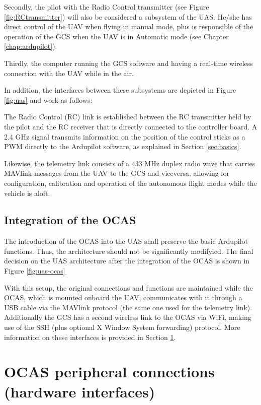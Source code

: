Secondly, the pilot with the Radio Control transmitter (see Figure \ref{fig:RCtransmitter}) will also be considered a subsystem of the UAS.
He/she has direct control of the UAV when flying in manual mode, plus is responsible of the operation of the GCS when the UAV is in Automatic mode (see Chapter \ref{chap:ardupilot}).

Thirdly, the computer running the GCS software and having a real-time wireless connection with the UAV while in the air.



In addition, the interfaces between these subsystems are depicted in Figure \ref{fig:uas} and work as follows:

The Radio Control (RC) link is established between the RC transmitter held by the pilot and the RC receiver that is directly connected to the controller board.
A 2.4 GHz signal transmits information on the position of the control sticks as a PWM directly to the Ardupilot software, as explained in Section \ref{sec:basics}.

Likewise, the telemetry link consists of a 433 MHz duplex radio wave that carries MAVlink messages from the UAV to the GCS and viceversa, allowing for configuration, calibration and operation of the autonomous flight modes while the vehicle is aloft.

\subsection{Integration of the OCAS} \label{sec:ocasintegration}

The introduction of the OCAS into the UAS shall preserve the basic Ardupilot functions.
Thus, the architecture should not be significantly modifyied.
The final decision on the UAS architecture after the integration of the OCAS is shown in Figure \ref{fig:uas-ocas}



With this setup, the original connections and functions are maintained while the OCAS, which is mounted onboard the UAV, communicates with it through a USB cable via the MAVlink protocol (the same one used for the telemetry link).
Additionally the GCS has a second wireless link to the OCAS via WiFi, making use of the SSH (plus optional X Window System forwarding) protocol.
More information on these interfaces is provided in Section \ref{sec:peripheral}.

\section{OCAS peripheral connections (hardware interfaces)} \label{sec:peripheral}

